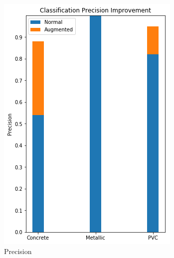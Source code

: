 \begin{figure}[H]
\begin{subfigure}[b]{0.4\linewidth}
    \includegraphics[width=\linewidth]{figures/Time-Precision.png}
    \caption{Precision}
  \end{subfigure}
  \begin{subfigure}[b]{0.4\linewidth}

\end{subfigure}
\end{figure}
